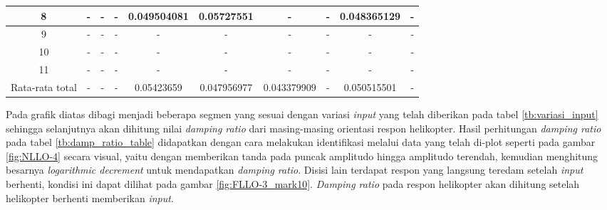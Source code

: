 \begin{table}[H]
{\begin{tabular}{|c|ccccccccc|}
			8 & \multicolumn{1}{c|}{-} & \multicolumn{1}{c|}{-} & \multicolumn{1}{c|}{-} & \multicolumn{1}{c|}{0.049504081} & \multicolumn{1}{c|}{0.05727551} & \multicolumn{1}{c|}{-} & \multicolumn{1}{c|}{-} & \multicolumn{1}{c|}{0.048365129} & - \\ \hline
			9 & \multicolumn{1}{c|}{-} & \multicolumn{1}{c|}{-} & \multicolumn{1}{c|}{-} & \multicolumn{1}{c|}{-} & \multicolumn{1}{c|}{-} & \multicolumn{1}{c|}{-} & \multicolumn{1}{c|}{-} & \multicolumn{1}{c|}{-} & - \\ \hline
			10 & \multicolumn{1}{c|}{-} & \multicolumn{1}{c|}{-} & \multicolumn{1}{c|}{-} & \multicolumn{1}{c|}{-} & \multicolumn{1}{c|}{-} & \multicolumn{1}{c|}{-} & \multicolumn{1}{c|}{-} & \multicolumn{1}{c|}{-} & - \\ \hline
			11 & \multicolumn{1}{c|}{-} & \multicolumn{1}{c|}{-} & \multicolumn{1}{c|}{-} & \multicolumn{1}{c|}{-} & \multicolumn{1}{c|}{-} & \multicolumn{1}{c|}{-} & \multicolumn{1}{c|}{-} & \multicolumn{1}{c|}{-} & - \\ \hline
			Rata-rata total & \multicolumn{1}{c|}{-} & \multicolumn{1}{c|}{-} & \multicolumn{1}{c|}{-} & \multicolumn{1}{c|}{0.05423659} & \multicolumn{1}{c|}{0.047956977} & \multicolumn{1}{c|}{0.043379909} & \multicolumn{1}{c|}{-} & \multicolumn{1}{c|}{0.050515501} & - \\ \hline
		\end{tabular}%
	}
\end{table}

Pada grafik diatas dibagi menjadi beberapa segmen yang sesuai dengan variasi \textit{input} yang telah diberikan pada tabel \ref{tb:variasi_input} sehingga selanjutnya akan dihitung nilai \textit{damping ratio} dari masing-masing orientasi respon helikopter. Hasil perhitungan \textit{damping ratio} pada tabel \ref{tb:damp_ratio_table} didapatkan dengan cara melakukan identifikasi melalui data yang telah di-plot seperti pada gambar \ref{fig:NLLO-4} secara visual, yaitu dengan memberikan tanda pada puncak amplitudo hingga amplitudo terendah, kemudian menghitung besarnya \textit{logarithmic decrement} untuk mendapatkan \textit{damping ratio}. Disisi lain terdapat respon yang langsung teredam setelah \textit{input} berhenti, kondisi ini dapat dilihat pada gambar \ref{fig:FLLO-3_mark10}. \textit{Damping ratio} pada respon helikopter akan dihitung setelah helikopter berhenti memberikan \textit{input}.

